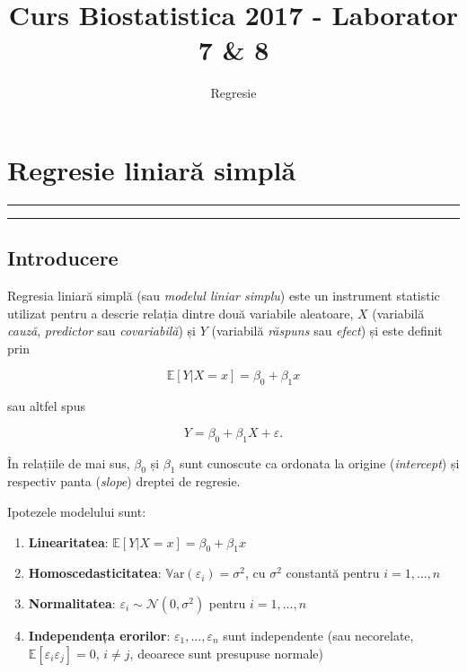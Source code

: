 \documentclass[]{article}
\title{Curs Biostatistica 2017 - Laborator 7 \& 8}
\subtitle{Regresie}
\author{}
\date{}
\providecommand{\tightlist}{%
  \setlength{\itemsep}{0pt}\setlength{\parskip}{0pt}}
\begin{document}
\maketitle

{
\setcounter{tocdepth}{2}
\tableofcontents
}
\section{Regresie liniară simplă}\label{regresie-liniara-simpla}

\begin{center}\rule{0.5\linewidth}{\linethickness}\end{center}

\begin{center}\rule{0.5\linewidth}{\linethickness}\end{center}

\subsection{Introducere}\label{introducere}

Regresia liniară simplă (sau \emph{modelul liniar simplu}) este un
instrument statistic utilizat pentru a descrie relația dintre două
variabile aleatoare, \(X\) (variabilă \emph{cauză}, \emph{predictor} sau
\emph{covariabilă}) și \(Y\) (variabilă \emph{răspuns} sau \emph{efect})
și este definit prin

\[
\mathbb{E}[Y|X=x]=\beta_0+\beta_1x 
\]

sau altfel spus

\[
Y = \beta_0 + \beta_1 X + \varepsilon.
\]

În relațiile de mai sus, \(\beta_0\) și \(\beta_1\) sunt cunoscute ca
ordonata la origine (\emph{intercept}) și respectiv panta (\emph{slope})
dreptei de regresie.

Ipotezele modelului sunt:

\begin{enumerate}
\def\labelenumi{\roman{enumi}.}
\tightlist
\item
  \textbf{Linearitatea}: \(\mathbb{E}[Y|X=x]=\beta_0+\beta_1x\)
\item
  \textbf{Homoscedasticitatea}:
  \(\mathbb{V}\text{ar}(\varepsilon_i)=\sigma^2\), cu \(\sigma^2\)
  constantă pentru \(i=1,\ldots,n\)
\item
  \textbf{Normalitatea}: \(\varepsilon_i\sim\mathcal{N}(0,\sigma^2)\)
  pentru \(i=1,\ldots,n\)
\item
  \textbf{Independența erorilor}: \(\varepsilon_1,\ldots,\varepsilon_n\)
  sunt independente (sau necorelate,
  \(\mathbb{E}[\varepsilon_i\varepsilon_j]=0\), \(i\neq j\), deoarece
  sunt presupuse normale)
\end{enumerate}
\end{document}
